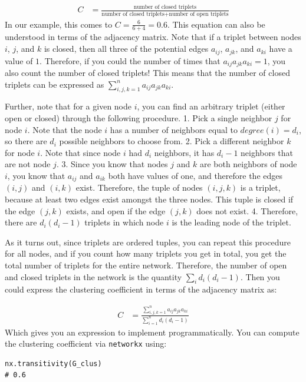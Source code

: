 \begin{align*}
    C &= \frac{\text{number of closed triplets}}{\text{number of closed triplets} + \text{number of open triplets}}
\end{align*}
In our example, this comes to $C = \frac{6}{6 + 4} = 0.6$. This equation can also be understood in terms of the adjacency matrix. Note that if a triplet between nodes $i$, $j$, and $k$ is closed, then all three of the potential edges $a_{ij}$, $a_{jk}$, and $a_{ki}$ have a value of $1$. Therefore, if you could the number of times that $a_{ij}a_{jk}a_{ki} = 1$, you also count the number of closed triplets! This means that the number of closed triplets can be expressed as $\sum_{i,j,k = 1}^na_{ij}a_{jk}a_{ki}$. 

Further, note that for a given node $i$, you can find an arbitrary triplet (either open or closed) through the following procedure.
1. Pick a single neighbor $j$ for node $i$. Note that the node $i$ has a number of neighbors equal to $degree(i) = d_i$, so there are $d_i$ possible neighbors to choose from.
2. Pick a different neighbor $k$ for node $i$. Note that since node $i$ had $d_i$ neighbors, it has $d_i - 1$ neighbors that are not node $j$.
3. Since you know that nodes $j$ and $k$ are both neighbors of node $i$, you know that $a_{ij}$ and $a_{ik}$ both have values of one, and therefore the edges $(i, j)$ and $(i, k)$ exist. Therefore, the tuple of nodes $(i, j, k)$ is a triplet, because {at least} two edges exist amongst the three nodes. This tuple is closed if the edge $(j, k)$ exists, and open if the edge $(j, k)$ does not exist.
4. Therefore, there are $d_i (d_i - 1)$ triplets in which node $i$ is the leading node of the triplet.

As it turns out, since triplets are {ordered tuples}, you can repeat this procedure for all nodes, and if you count how many triplets you get in total, you get the {total number of triplets} for the entire network. Therefore, the number of open and closed triplets in the network is the quantity $\sum_i d_i (d_i - 1)$.  Then you could express the clustering coefficient in terms of the adjacency matrix as:

\begin{align*}
    C &= \frac{\sum_{i,j,k = 1}^n a_{ij}a_{jk}a_{ki}}{\sum_{i = 1}^n d_i (d_i - 1)}
\end{align*}
Which gives you an expression to implement programmatically. You can compute the clustering coefficient via \texttt{networkx} using:

\begin{lstlisting}[style=python]
nx.transitivity(G_clus)
# 0.6
\end{lstlisting}



